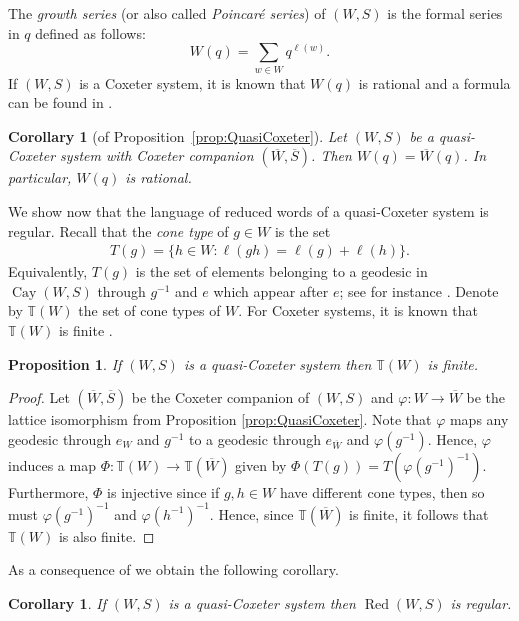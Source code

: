 \documentclass[A4paper, oneside]{amsart}
\newcommand{\Red}{\operatorname{Red}}
\newcommand{\id}{\textit{e}}
\newcommand{\Cay}{\operatorname{Cay}}
\newcommand{\T}{\mathbb{T}}
\newtheorem{cor}[thm]{Corollary}
\newtheorem{prop}[thm]{Proposition}
\theoremstyle{definition}
\begin{document}
The {\em growth series} (or also called {\em Poincar\'e series}) of $(W,S)$ is the formal series in $q$ defined as follows:
$$
W(q)=\sum_{w\in W} q^{\ell(w)}.
$$
If $(W,S)$ is a Coxeter system, it is known that $W(q)$ is rational and a formula can be found in \cite[Chapter~7]{BjBr05}.

\begin{cor}[of Proposition~\ref{prop:QuasiCoxeter}]\label{cor:Growth} Let $(W,S)$ be a quasi-Coxeter system with Coxeter companion $(\overline{W}, \overline{S})$. Then $W(q)=\overline{W}(q)$. In particular, $W(q)$ is rational. 
\end{cor}

We show now that the language of reduced words of a quasi-Coxeter system is regular.  Recall that  the \emph{cone type} of $g \in W$ is the set
    \begin{align*}
        T(g) = \{h \in W : \ell(gh) = \ell(g) + \ell(h)\}.
    \end{align*}
    Equivalently, $T(g)$ is the set of elements belonging to a geodesic in $\Cay(W,S)$ through $g^{-1}$ and $\id$ which appear after $\id$; see for instance \cite{Ep+92}. Denote by $\mathbb{T}(W)$ the set of cone types of $W$. For Coxeter systems, it is known that $\T(W)$ is finite \cite[Corollary 2.10]{RegPartition}.

\begin{prop}
\label{prop:cone}
    If $(W,S)$ is a quasi-Coxeter system then $\T(W)$ is finite. 
\end{prop}

\begin{proof}
    Let $(\overline{W}, \overline{S})$ be the Coxeter companion of $(W,S)$ and $\varphi : W \to \overline{W}$ be the lattice isomorphism from Proposition \ref{prop:QuasiCoxeter}. Note that $\varphi$ maps any geodesic through $\id_W$ and $g^{-1}$ to a geodesic through $\id_{\overline{W}}$ and $\varphi(g^{-1})$. Hence, $\varphi$ induces a map $\Phi : \mathbb{T}(W) \to \mathbb{T}(\overline{W})$ given by $\Phi(T(g)) = T(\varphi(g^{-1})^{-1})$. Furthermore, $\Phi$ is injective since if $g,h \in W$ have different cone types, then so must $\varphi(g^{-1})^{-1}$ and $\varphi(h^{-1})^{-1}$. Hence, since $\mathbb{T}(\overline{W})$ is finite, it follows that $\T(W)$ is also finite.
\end{proof}

As a consequence of \cite[Theorem 1.2.9]{Ep+92} we obtain the following corollary.

\begin{cor}
\label{cor:regular}
If $(W,S)$ is a quasi-Coxeter system then $\Red(W,S)$ is regular. 
\end{cor}
\end{document}
